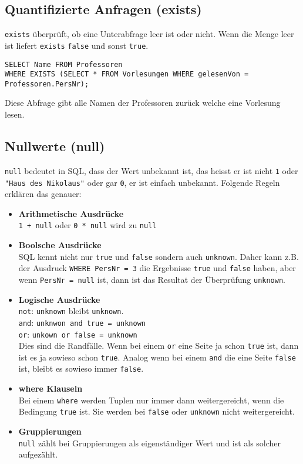 
\subsection{Quantifizierte Anfragen (exists)}

\texttt{exists} überprüft, ob eine Unterabfrage leer ist oder nicht. Wenn die Menge leer ist liefert \texttt{exists} \texttt{false} und sonst \texttt{true}.

\begin{lstlisting}[caption={SQL Beispiel mit Exists},label=lst:bsp_exists]
SELECT Name FROM Professoren
WHERE EXISTS (SELECT * FROM Vorlesungen WHERE gelesenVon = Professoren.PersNr);
\end{lstlisting}

Diese Abfrage gibt alle Namen der Professoren zurück welche eine Vorlesung lesen.

\subsection{Nullwerte (null)}

\texttt{null} bedeutet in SQL, dass der Wert unbekannt ist, das heisst er ist nicht \texttt{1} oder \texttt{"Haus des Nikolaus"} oder gar \texttt{0}, er ist einfach unbekannt. Folgende Regeln erklären das genauer:

\begin{itemize}
  \item \textbf{Arithmetische Ausdrücke} \\
  \texttt{1 + null} oder \texttt{0 * null} wird zu \texttt{null}
  \item \textbf{Boolsche Ausdrücke} \\
  SQL kennt nicht nur \texttt{true} und \texttt{false} sondern auch \texttt{unknown}. Daher kann z.B. der Ausdruck \texttt{WHERE PersNr = 3} die Ergebnisse \texttt{true} und \texttt{false} haben, aber wenn \texttt{PersNr = null} ist, dann ist das Resultat der Überprüfung \texttt{unknown}.
  \item \textbf{Logische Ausdrücke} \\
  \texttt{not}: \texttt{unknown} bleibt \texttt{unknown}. \\
  \texttt{and}: \texttt{unknwon and true = unknown} \\
  \texttt{or}: \texttt{unkown or false = unknown} \\
  Dies sind die Randfälle. Wenn bei einem \texttt{or} eine Seite ja schon \texttt{true} ist, dann ist es ja sowieso schon \texttt{true}. Analog wenn bei einem \texttt{and} die eine Seite \texttt{false} ist, bleibt es sowieso immer \texttt{false}.
  \item \textbf{where Klauseln} \\
  Bei einem \texttt{where} werden Tuplen nur immer dann weitergereicht, wenn die Bedingung \texttt{true} ist. Sie werden bei \texttt{false} oder \texttt{unknown} nicht weitergereicht.
  \item \textbf{Gruppierungen} \\
  \texttt{null} zählt bei Gruppierungen als eigenständiger Wert und ist als solcher aufgezählt.
\end{itemize}

